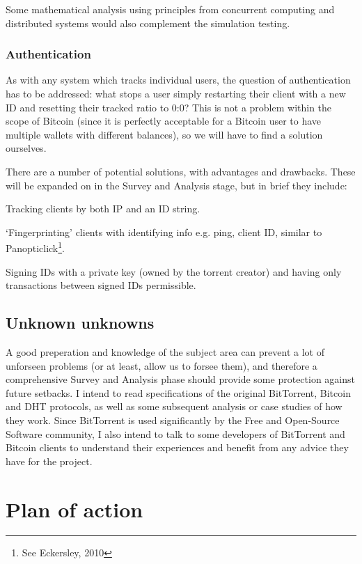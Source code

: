 \documentclass{article}
\begin{document}
Some mathematical analysis using principles from concurrent computing and distributed systems would also complement the simulation testing.

\subsubsection{Authentication}
As with any system which tracks individual users, the question of authentication has to be addressed: what stops a user simply restarting their client with a new ID and resetting their tracked ratio to 0:0?  This is not a problem within the scope of Bitcoin (since it is perfectly acceptable for a Bitcoin user to have multiple wallets with different balances), so we will have to find a solution ourselves.

There are a number of potential solutions, with advantages and drawbacks.  These will be expanded on in the Survey and Analysis stage, but in brief they include:
\begin{itemize*}
\item Tracking clients by both IP and an ID string.
\item `Fingerprinting' clients with identifying info e.g. ping, client ID, similar to Panopticlick\footnote{See Eckersley, 2010}.
\item Signing IDs with a private key (owned by the torrent creator) and having only transactions between signed IDs permissible.
\end{itemize*}

\subsection{Unknown unknowns}
A good preperation and knowledge of the subject area can prevent a lot of unforseen problems (or at least, allow us to forsee them), and therefore a comprehensive Survey and Analysis phase should provide some protection against future setbacks.  I intend to read specifications of the original BitTorrent, Bitcoin and DHT protocols, as well as some subsequent analysis or case studies of how they work.  Since BitTorrent is used significantly by the Free and Open-Source Software community, I also intend to talk to some developers of BitTorrent and Bitcoin clients to understand their experiences and benefit from any advice they have for the project.

\section{Plan of action}
\end{document}
